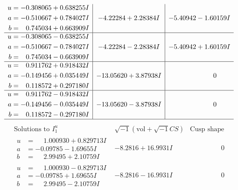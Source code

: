 \documentclass[1p]{elsarticle_modified}
\theoremstyle{definition}
\newcommand{\I}{\sqrt{-1}}
\begin{document}
$$\begin{array}{c|c|c}
\begin{aligned}
u &= -0.308065 + 0.638255 I \\
a &= -0.510667 + 0.784027 I \\
b &= \phantom{-}0.745034 + 0.663909 I\end{aligned}
 & -4.22284 + 2.28384 I & -5.40942 - 1.60159 I \\ \hline\begin{aligned}
u &= -0.308065 - 0.638255 I \\
a &= -0.510667 - 0.784027 I \\
b &= \phantom{-}0.745034 - 0.663909 I\end{aligned}
 & -4.22284 - 2.28384 I & -5.40942 + 1.60159 I \\ \hline\begin{aligned}
u &= \phantom{-}0.911762 + 0.918432 I \\
a &= -0.149456 + 0.035449 I \\
b &= \phantom{-}0.118572 + 0.297180 I\end{aligned}
 & -13.05620 + 3.87938 I & \phantom{-0.000000 } 0 \\ \hline\begin{aligned}
u &= \phantom{-}0.911762 - 0.918432 I \\
a &= -0.149456 - 0.035449 I \\
b &= \phantom{-}0.118572 - 0.297180 I\end{aligned}
 & -13.05620 - 3.87938 I & \phantom{-0.000000 } 0\\
 \hline 
 \end{array}$$\newpage$$\begin{array}{c|c|c}  
\text{Solutions to }I^u_{1}& \I (\text{vol} + \sqrt{-1}CS) & \text{Cusp shape}\\
 \hline 
\begin{aligned}
u &= \phantom{-}1.000930 + 0.829713 I \\
a &= -0.09785 - 1.69655 I \\
b &= \phantom{-}2.99495 + 2.10759 I\end{aligned}
 & -8.2816 + 16.9931 I & \phantom{-0.000000 } 0 \\ \hline\begin{aligned}
u &= \phantom{-}1.000930 - 0.829713 I \\
a &= -0.09785 + 1.69655 I \\
b &= \phantom{-}2.99495 - 2.10759 I\end{aligned}
 & -8.2816 - 16.9931 I & \phantom{-0.000000 } 0 \\ \hline\begin{aligned}

\end{aligned}
\end{array}$$
\end{document}
